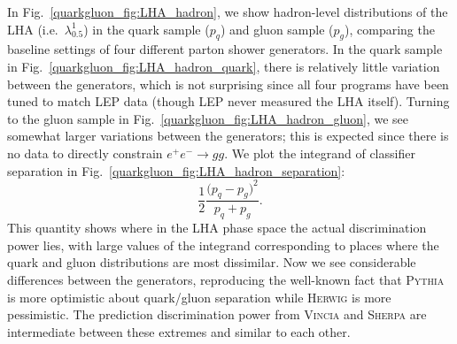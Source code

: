 \documentclass[11pt]{cernrep}
\begin{document}
In Fig.~\ref{quarkgluon_fig:LHA_hadron}, we show hadron-level distributions of the LHA (i.e.~$\lambda_{0.5}^1$) in the quark sample ($p_q$) and gluon sample ($p_g$), comparing the baseline settings of four different parton shower generators.  In the quark sample in Fig.~\ref{quarkgluon_fig:LHA_hadron_quark}, there is relatively little variation between the generators, which is not surprising since all four programs have been tuned to match LEP data (though LEP never measured the LHA itself).  Turning to the gluon sample in Fig.~\ref{quarkgluon_fig:LHA_hadron_gluon}, we see somewhat larger variations between the generators; this is expected since there is no data to directly constrain $e^+ e^- \to gg$.   We plot the integrand of classifier separation in Fig.~\ref{quarkgluon_fig:LHA_hadron_separation}:
\begin{equation}
\label{quarkgluon_eq:deltaintegrand}
\frac{1}{2} \frac{\bigl(p_q - p_g\bigr)^2}{p_q + p_g}.
\end{equation}
This quantity shows where in the LHA phase space the actual discrimination power lies, with large values of the integrand corresponding to places where the quark and gluon distributions are most dissimilar.  Now we see considerable differences between the generators, reproducing the well-known fact that \textsc{Pythia} is more optimistic about quark/gluon separation while \textsc{Herwig} is more pessimistic.  The prediction discrimination power from \textsc{Vincia} and \textsc{Sherpa} are intermediate between these extremes and similar to each other.
\end{document}

